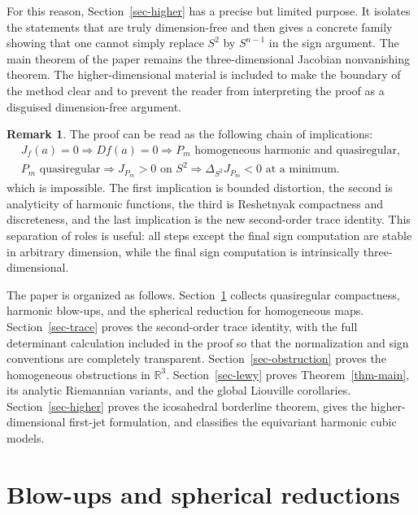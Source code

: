 \documentclass[10pt]{amsart}
\numberwithin{equation}{section}
\theoremstyle{definition}
\newtheorem{remark}{Remark}[section]
\newcommand{\R}{\mathbb R}
\begin{document}
For this reason, Section~\ref{sec-higher} has a precise but limited purpose.
It isolates the statements that are truly dimension-free and then gives a
concrete family showing that one cannot simply replace \(S^2\) by
\(S^{n-1}\) in the sign argument. The main theorem of the paper remains the
three-dimensional Jacobian nonvanishing theorem. The higher-dimensional material is
included to make the boundary of the method clear and to prevent the reader
from interpreting the proof as a disguised dimension-free argument.


\begin{remark}
The proof can be read as the following chain of implications:
\[
\begin{gathered}
        J_f(a)=0
        \Longrightarrow
        Df(a)=0
        \Longrightarrow
        P_m\text{ homogeneous harmonic and quasiregular},\\
        P_m\text{ quasiregular}
        \Longrightarrow
        J_{P_m}>0\text{ on }S^2
        \Longrightarrow
        \Delta_{S^2}J_{P_m}<0\text{ at a minimum}.
\end{gathered}
\]
which is impossible. The first implication is bounded distortion, the second is
analyticity of harmonic functions, the third is Reshetnyak compactness and
discreteness, and the last implication is the new second-order trace identity.
This separation of roles is useful: all steps except the final sign computation
are stable in arbitrary dimension, while the final sign computation is
intrinsically three-dimensional.
\end{remark}

The paper is organized as follows. Section~\ref{sec-preliminaries} collects
quasiregular compactness, harmonic blow-ups, and the spherical reduction for
homogeneous maps. Section~\ref{sec-trace} proves the second-order trace
identity, with the full determinant calculation included in the proof so that
the normalization and sign conventions are completely transparent.
Section~\ref{sec-obstruction} proves the homogeneous obstructions in
\(\R^3\). Section~\ref{sec-lewy} proves Theorem~\ref{thm-main}, its analytic
Riemannian variants, and the global Liouville corollaries.
Section~\ref{sec-higher} proves the icosahedral
borderline theorem, gives the higher-dimensional first-jet formulation, and
classifies the equivariant harmonic cubic models.

\section{Blow-ups and spherical reductions}
\label{sec-preliminaries}
\end{document}

